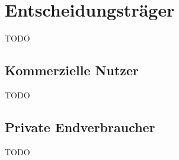 \documentclass[Bachelorarbeit.tex]{subfiles}
\begin{document}
\chapter{Entscheidungsträger}
TODO

\section{Kommerzielle Nutzer}
TODO

\section{Private Endverbraucher}
TODO
\end{document}

